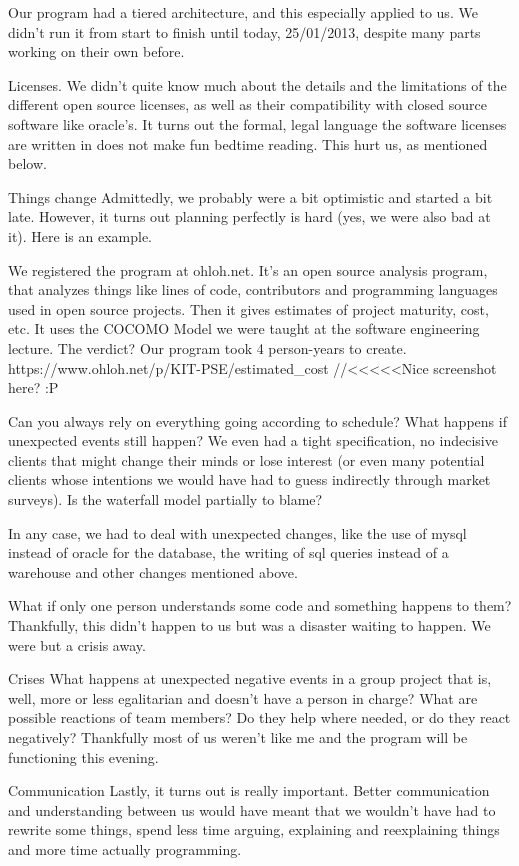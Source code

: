     Our program had a tiered architecture, and this especially applied to us. We didn't run it from start to finish until today, 25/01/2013, despite many parts working on their own before.

Licenses.
    We didn't quite know much about the details and the limitations of the different open source licenses, as well as their compatibility with closed source software like oracle's.
     It turns out the formal, legal language the software licenses are written in does not make fun bedtime reading.
     This hurt us, as mentioned below.

Things change
    Admittedly, we probably were a bit optimistic and started a bit late. However, it turns out planning perfectly is hard (yes, we were also bad at it). Here is an example.
    
    We registered the program at ohloh.net. It's an open source analysis program, that analyzes things like lines of code, contributors and programming languages used in open source projects.
    Then it gives estimates of project maturity, cost, etc.
    It uses the COCOMO Model we were taught at the software engineering lecture.
    The verdict? Our program took 4 person-years to create.
    https://www.ohloh.net/p/KIT-PSE/estimated_cost
    //<<<<<Nice screenshot here? :P
    
    
    Can you always rely on everything going according to schedule? What happens if unexpected events still happen? We even had a tight specification,
    no indecisive clients that might change their minds or lose interest (or even many potential clients whose intentions we would have had to guess indirectly through market surveys).
    Is the waterfall model partially to blame?
    
    In any case, we had to deal with unexpected changes, like the use of mysql instead of oracle for the database, the writing of sql queries instead of a warehouse and other changes mentioned above.
    

What if only one person understands some code and something happens to them?
    Thankfully, this didn't happen to us but was a disaster waiting to happen. We were but a crisis away.
    
Crises
    What happens at unexpected negative events in a group project that is, well, more or less egalitarian and doesn't have a person in charge? What are possible reactions of team members?
    Do they help where needed, or do they react negatively?
    Thankfully most of us weren't like me and the program will be functioning this evening.

Communication
    Lastly, it turns out is really important. Better communication and understanding between us would have meant that we wouldn't have had to rewrite some things, spend less time arguing, explaining and reexplaining things and more time
    actually programming.
